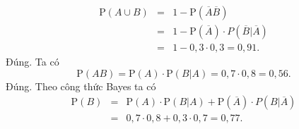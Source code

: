 \begin{ex}
{\begin{itemchoice}
\begin{eqnarray*}
				\mathrm{P}(A \cup B) &=& 1-\mathrm{P}\left(\overline{A} \overline {B}\right)\\
				&=& 1- \mathrm{P}\left(\overline{A}\right) \cdot P\left( \overline{B} \big| \overline{A}\right)\\
				&=&1- 0{,}3 \cdot 0{,}3= 0{,}91.
			\end{eqnarray*}
			\itemch Đúng. Ta có
			\[
			\mathrm{P}(AB)= \mathrm{P}(A) \cdot \mathrm{P}(B|A)= 0{,}7\cdot 0{,}8= 0{,}56.
			\]
			\itemch Đúng. Theo công thức Bayes ta có
			\begin{eqnarray*}
				\mathrm{P}(B) &=& \mathrm{P}(A) \cdot \mathrm{P}(B|A) +\mathrm{P}\left(\overline{A}\right) \cdot P\left(B|\overline{A}\right)\\
				&=& 0{,}7 \cdot 0{,}8+ 0{,}3\cdot 0{,}7= 0{,}77.
			\end{eqnarray*}			
		\end{itemchoice}
	}
\end{ex}

